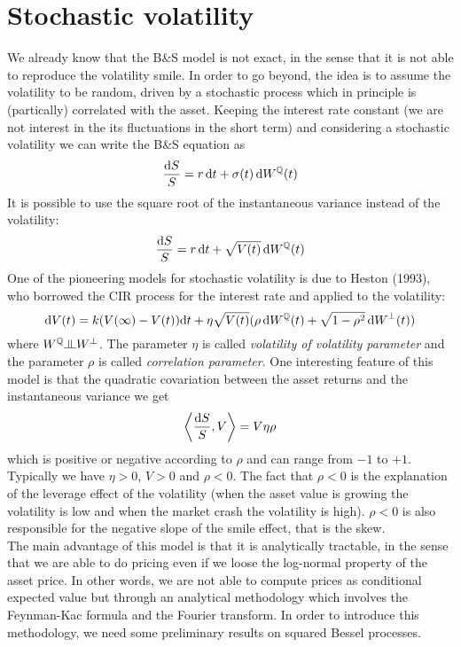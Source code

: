 \section{Stochastic volatility}
We already know that the B\&S model is not exact, in the sense that it is not able to reproduce the volatility smile. In order to go beyond, the idea is to assume the volatility to be random, driven by a stochastic process which in principle is (partically) correlated with the asset. Keeping the interest rate constant (we are not interest in the its fluctuations in the short term) and considering a stochastic volatility we can write the B\&S equation as
\begin{equation}
    \frac{\dd S}{S} = r\,\dd t + \sigma(t)\,\dd W^{\mathbb{Q}}(t)
\end{equation}
It is possible to use the square root of the instantaneous variance instead of the volatility:
\begin{equation}
    \frac{\dd S}{S} = r\,\dd t + \sqrt{V(t)}\,\dd W^{\mathbb{Q}}(t)
\end{equation}
One of the pioneering models for stochastic volatility is due to Heston (1993), who borrowed the CIR process for the interest rate and applied to the volatility:
\begin{equation}
    \dd V(t) = k(V(\infty)-V(t))\dd t + \eta\sqrt{V(t)}(\rho\,\dd W^{\mathbb{Q}}(t) + \sqrt{1-\rho^2}\,\dd W^{\perp}(t))
\end{equation}%
where $W^{\Qmeas}\indep W^{\perp}$. The parameter $\eta$ is called \emph{volatility of volatility parameter} and the parameter $\rho$ is called \emph{correlation parameter}. One interesting feature of this model is that the quadratic covariation between the asset returns and the instantaneous variance we get
\begin{equation*}
    \expval{\frac{\dd S}{S}, V} = V\eta\rho
\end{equation*}
which is positive or negative according to $\rho$ and can range from $-1$ to $+1$. Typically we have $\eta>0$, $V>0$ and $\rho<0$. The fact that $\rho<0$ is the explanation of the leverage effect of the volatility (when the asset value is growing the volatility is low and when the market crash the volatility is high). $\rho<0$ is also responsible for the negative slope of the smile effect, that is the skew. \\ %
The main advantage of this model is that it is analytically tractable, in the sense that we are able to do pricing even if we loose the log-normal property of the asset price. In other words, we are not able to compute prices as conditional expected value but through an analytical methodology which involves the Feynman-Kac formula and the Fourier transform. In order to introduce this methodology, we need some preliminary results on squared Bessel processes.

